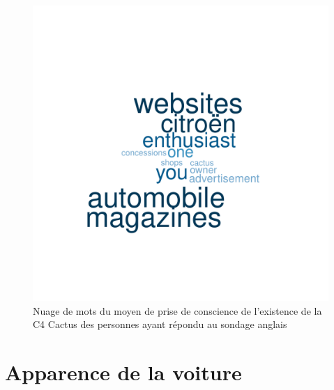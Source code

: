 \documentclass[12pt]{article}\usepackage[]{graphicx}\usepackage[]{color}
\makeatletter
\def\maxwidth{ %
  \ifdim\Gin@nat@width>\linewidth
    \linewidth
  \else
    \Gin@nat@width
  \fi
}
\newenvironment{knitrout}{}{} %
\makeatother
\begin{document}
\begin{knitrout}
\color{fgcolor}\begin{figure}[H]
\includegraphics[width=\maxwidth]{figure/means_en-1} \caption[Nuage de mots du moyen de prise de conscience de l'existence de la C4 Cactus des personnes ayant répondu au sondage anglais]{Nuage de mots du moyen de prise de conscience de l'existence de la C4 Cactus des personnes ayant répondu au sondage anglais}\label{fig:means en}
\end{figure}


\end{knitrout}

\section{Apparence de la voiture}
\end{document}
